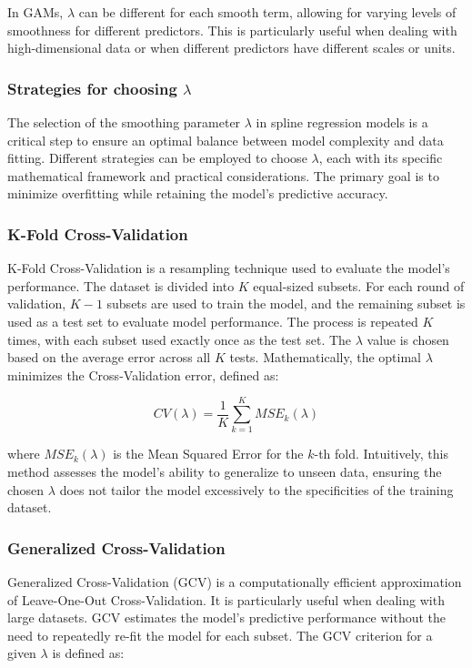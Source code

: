 \documentclass[12pt, twoside,hidelinks]{article}
\theoremstyle{definition}
\numberwithin{equation}{section}
\begin{document}
In GAMs, \( \lambda \) can be different for each smooth term, allowing for varying levels of smoothness for different predictors. This is particularly useful when dealing with high-dimensional data or when different predictors have different scales or units.

\subsubsection{Strategies for choosing \(\lambda\)}
The selection of the smoothing parameter \(\lambda\) in spline regression models is a critical step to ensure an optimal balance between model complexity and data fitting. Different strategies can be employed to choose \(\lambda\), each with its specific mathematical framework and practical considerations. The primary goal is to minimize overfitting while retaining the model's predictive accuracy.

\subsubsection*{K-Fold Cross-Validation}
K-Fold Cross-Validation is a resampling technique used to evaluate the model's performance. The dataset is divided into \(K\) equal-sized subsets. For each round of validation, \(K-1\) subsets are used to train the model, and the remaining subset is used as a test set to evaluate model performance. The process is repeated \(K\) times, with each subset used exactly once as the test set. The \(\lambda\) value is chosen based on the average error across all \(K\) tests. Mathematically, the optimal \(\lambda\) minimizes the Cross-Validation error, defined as:

\[
CV(\lambda) = \frac{1}{K} \sum_{k=1}^{K} MSE_k(\lambda)
\]

where \(MSE_k(\lambda)\) is the Mean Squared Error for the \(k\)-th fold. Intuitively, this method assesses the model's ability to generalize to unseen data, ensuring the chosen \(\lambda\) does not tailor the model excessively to the specificities of the training dataset.

\subsubsection*{Generalized Cross-Validation}
Generalized Cross-Validation (GCV) is a computationally efficient approximation of Leave-One-Out Cross-Validation. It is particularly useful when dealing with large datasets. GCV estimates the model's predictive performance without the need to repeatedly re-fit the model for each subset. The GCV criterion for a given \(\lambda\) is defined as:
\end{document}
